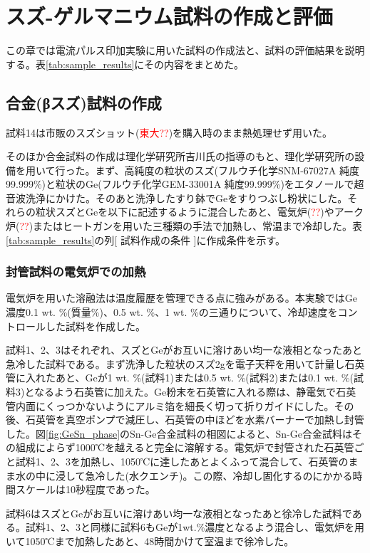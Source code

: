 \section{スズ-ゲルマニウム試料の作成と評価}
この章では電流パルス印加実験に用いた試料の作成法と、試料の評価結果を説明する。表\ref{tab:sample_results}にその内容をまとめた。

\subsection{合金(βスズ)試料の作成}
試料14は市販のスズショット(\textcolor{red}{東大??})を購入時のまま熱処理せず用いた。

そのほか合金試料の作成は理化学研究所吉川氏の指導のもと、理化学研究所の設備を用いて行った。まず、高純度の粒状のスズ(フルウチ化学SNM-67027A 純度99.999\%)と粒状のGe(フルウチ化学GEM-33001A 純度99.999\%)をエタノールで超音波洗浄にかけた。そのあと洗浄したすり鉢でGeをすりつぶし粉状にした。それらの粒状スズとGeを以下に記述するように混合したあと、電気炉(\textcolor{red}{??})やアーク炉(\textcolor{red}{??})またはヒートガンを用いた三種類の手法で加熱し、常温まで冷却した。表\ref{tab:sample_results}の列[ 試料作成の条件 ]に作成条件を示す。

\subsubsection{封管試料の電気炉での加熱}
電気炉を用いた溶融法は温度履歴を管理できる点に強みがある。本実験ではGe濃度0.1 wt. \%(質量\%)、0.5 wt. \%、1 wt. \%の三通りについて、冷却速度をコントロールした試料を作成した。

試料1、2、3はそれぞれ、スズとGeがお互いに溶けあい均一な液相となったあと急冷した試料である。まず洗浄した粒状のスズ2gを電子天秤を用いて計量し石英管に入れたあと、Geが1 wt. \%(試料1)または0.5 wt. \%(試料2)または0.1 wt. \%(試料3)となるよう石英管に加えた。Ge粉末を石英管に入れる際は、静電気で石英管内面にくっつかないようにアルミ箔を細長く切って折りガイドにした。その後、石英管を真空ポンプで減圧し、石英管の中ほどを水素バーナーで加熱し封管した。図\ref{fig:GeSn_phase}のSn-Ge合金試料の相図によると、Sn-Ge合金試料はその組成によらず1000℃を越えると完全に溶解する。電気炉で封管された石英管ごと試料1、2、3を加熱し、1050℃に達したあとよくふって混合して、石英管のまま水の中に浸して急冷した(水クエンチ)。この際、冷却し固化するのにかかる時間スケールは10秒程度であった。

試料6はスズとGeがお互いに溶けあい均一な液相となったあと徐冷した試料である。試料1、2、3と同様に試料6もGeが1wt.\%濃度となるよう混合し、電気炉を用いて1050℃まで加熱したあと、48時間かけて室温まで徐冷した。


